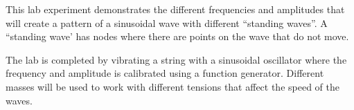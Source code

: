 {This lab experiment demonstrates the different frequencies and amplitudes that will create a pattern of a sinusoidal wave with different “standing waves”.  A “standing wave’ has nodes where there are points on the wave that do not move.}

{The lab is completed by vibrating a string with a sinusoidal oscillator  where the frequency and amplitude is calibrated using a function generator. Different masses will be used to work with different tensions that affect the speed of the waves.}

{}

